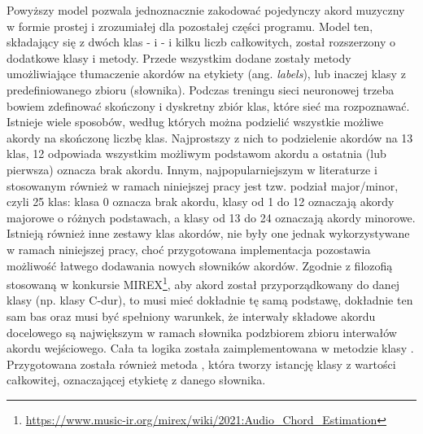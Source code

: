 Powyższy model pozwala jednoznacznie zakodować pojedynczy akord muzyczny w formie prostej i
zrozumiałej dla pozostałej części programu. Model ten, składający się z dwóch klas - 
i  - i kilku liczb całkowitych, został rozszerzony o dodatkowe klasy i metody. Przede
wszystkim dodane zostały metody umożliwiające tłumaczenie akordów na etykiety (ang. \emph{labels}),
lub inaczej klasy z predefiniowanego zbioru (słownika). Podczas treningu sieci neuronowej trzeba
bowiem zdefinować skończony i dyskretny zbiór klas, które sieć ma rozpoznawać. Istnieje wiele
sposobów, według których można podzielić wszystkie możliwe akordy na skończonę liczbę klas.
Najprostszy z nich to podzielenie akordów na 13 klas, 12 odpowiada wszystkim możliwym podstawom
akordu a ostatnia (lub pierwsza) oznacza brak akordu. Innym, najpopularniejszym w literaturze i
stosowanym również w ramach niniejszej pracy jest tzw. podział major/minor, czyli 25 klas: klasa 0
oznacza brak akordu, klasy od 1 do 12 oznaczają akordy majorowe o różnych podstawach, a klasy od 13
do 24 oznaczają akordy minorowe. Istnieją również inne zestawy klas akordów, nie były one jednak
wykorzystywane w ramach niniejszej pracy, choć przygotowana implementacja pozostawia możliwość
łatwego dodawania nowych słowników akordów. Zgodnie z filozofią stosowaną w konkursie
MIREX\footnote{\url{https://www.music-ir.org/mirex/wiki/2021:Audio_Chord_Estimation}}, aby akord został
przyporządkowany do danej klasy (np. klasy C-dur), to musi mieć dokładnie tę samą podstawę,
dokładnie ten sam bas oraz musi być spełniony warunkek, że interwały składowe akordu docelowego są
największym w ramach słownika podzbiorem zbioru interwałów akordu wejściowego. Cała ta logika
została zaimplementowana w metodzie  klasy . Przygotowana została
również metoda , która tworzy istancję klasy  z wartości całkowitej,
oznaczającej etykietę z danego słownika.

